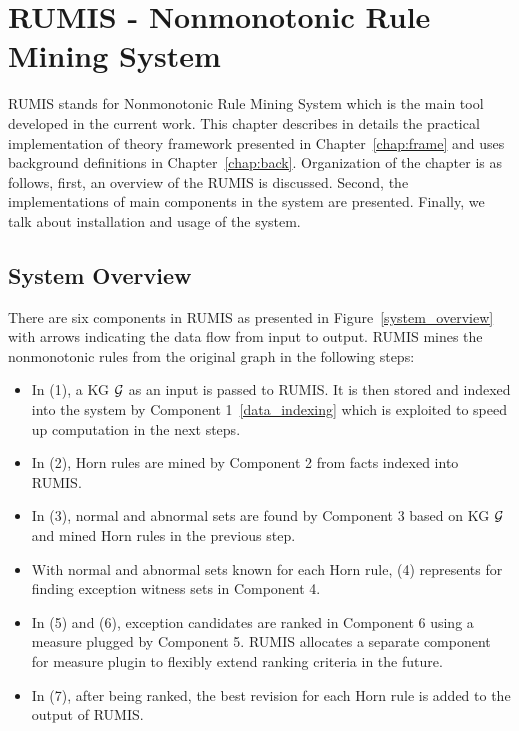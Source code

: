 \chapter{RUMIS - Nonmonotonic Rule Mining System}\label{chap:system}

RUMIS stands for Nonmonotonic Rule Mining System which is the main tool developed in the current work. This chapter describes in details the practical implementation of theory framework presented in Chapter~\ref{chap:frame} and uses background definitions in Chapter~\ref{chap:back}. Organization of the chapter is as follows, first, an overview of the RUMIS is discussed. Second, the implementations of main components in the system are presented. Finally, we talk about installation and usage of the system.

\section{System Overview}
\label{sec:overview}

There are six components in RUMIS as presented in Figure~\ref{system_overview} with arrows indicating the data flow from input to output. RUMIS mines the nonmonotonic rules from the original graph in the following steps:

\begin{itemize}
\item In (1), a KG $\mathcal{G}$ as an input is passed to RUMIS. It is then stored and indexed into the system by Component 1~\ref{data_indexing} which is exploited to speed up computation in the next steps.
\item In (2), Horn rules are mined by Component 2 from facts indexed into RUMIS.
\item In (3), normal and abnormal sets are found by Component 3 based on KG $\mathcal{G}$ and mined Horn rules in the previous step.
\item With normal and abnormal sets known for each Horn rule, (4) represents for finding exception witness sets in Component 4.
\item In (5) and (6), exception candidates are ranked in Component 6 using a measure plugged by Component 5. RUMIS allocates a separate component for measure plugin to flexibly extend ranking criteria in the future.
\item In (7), after being ranked, the best revision for each Horn rule is added to the output of RUMIS.
\end{itemize}

